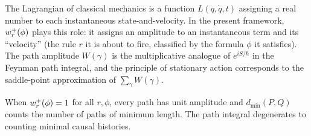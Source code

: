 \begin{remark}
The Lagrangian of classical mechanics is a function $L(q, \dot{q}, t)$
assigning a real number to each instantaneous state-and-velocity.  In the
present framework, $w^{+}_r(\phi)$ plays this role: it assigns an amplitude
to an instantaneous term and its ``velocity'' (the rule $r$ it is about to
fire, classified by the formula $\phi$ it satisfies).  The path amplitude
$W(\gamma)$ is the multiplicative analogue of $e^{iS/\hbar}$ in the Feynman
path integral, and the principle of stationary action corresponds to the
saddle-point approximation of $\sum_\gamma W(\gamma)$.
\end{remark}

\begin{remark}
When $w^{+}_r(\phi) = 1$ for all $r, \phi$, every path has unit amplitude and
$d_{\min}(P, Q)$ counts the number of paths of minimum length.  The path
integral degenerates to counting minimal causal histories.
\end{remark}

